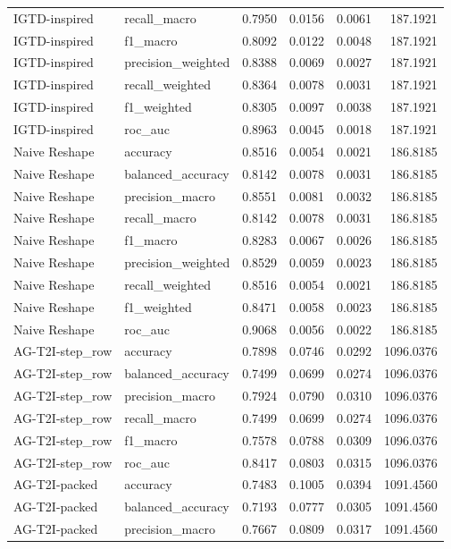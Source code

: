 \begin{tabular}{llrrrr}
IGTD-inspired & recall_macro & 0.7950 & 0.0156 & 0.0061 & 187.1921 \\
IGTD-inspired & f1_macro & 0.8092 & 0.0122 & 0.0048 & 187.1921 \\
IGTD-inspired & precision_weighted & 0.8388 & 0.0069 & 0.0027 & 187.1921 \\
IGTD-inspired & recall_weighted & 0.8364 & 0.0078 & 0.0031 & 187.1921 \\
IGTD-inspired & f1_weighted & 0.8305 & 0.0097 & 0.0038 & 187.1921 \\
IGTD-inspired & roc_auc & 0.8963 & 0.0045 & 0.0018 & 187.1921 \\
Naive Reshape & accuracy & 0.8516 & 0.0054 & 0.0021 & 186.8185 \\
Naive Reshape & balanced_accuracy & 0.8142 & 0.0078 & 0.0031 & 186.8185 \\
Naive Reshape & precision_macro & 0.8551 & 0.0081 & 0.0032 & 186.8185 \\
Naive Reshape & recall_macro & 0.8142 & 0.0078 & 0.0031 & 186.8185 \\
Naive Reshape & f1_macro & 0.8283 & 0.0067 & 0.0026 & 186.8185 \\
Naive Reshape & precision_weighted & 0.8529 & 0.0059 & 0.0023 & 186.8185 \\
Naive Reshape & recall_weighted & 0.8516 & 0.0054 & 0.0021 & 186.8185 \\
Naive Reshape & f1_weighted & 0.8471 & 0.0058 & 0.0023 & 186.8185 \\
Naive Reshape & roc_auc & 0.9068 & 0.0056 & 0.0022 & 186.8185 \\
AG-T2I-step_row & accuracy & 0.7898 & 0.0746 & 0.0292 & 1096.0376 \\
AG-T2I-step_row & balanced_accuracy & 0.7499 & 0.0699 & 0.0274 & 1096.0376 \\
AG-T2I-step_row & precision_macro & 0.7924 & 0.0790 & 0.0310 & 1096.0376 \\
AG-T2I-step_row & recall_macro & 0.7499 & 0.0699 & 0.0274 & 1096.0376 \\
AG-T2I-step_row & f1_macro & 0.7578 & 0.0788 & 0.0309 & 1096.0376 \\
AG-T2I-step_row & roc_auc & 0.8417 & 0.0803 & 0.0315 & 1096.0376 \\
AG-T2I-packed & accuracy & 0.7483 & 0.1005 & 0.0394 & 1091.4560 \\
AG-T2I-packed & balanced_accuracy & 0.7193 & 0.0777 & 0.0305 & 1091.4560 \\
AG-T2I-packed & precision_macro & 0.7667 & 0.0809 & 0.0317 & 1091.4560 \\

\end{tabular}
